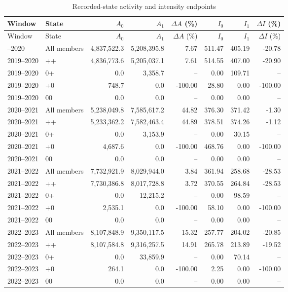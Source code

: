 \medskip\begin{longtable}{@{}llrrrrrr@{}}\caption{Recorded-state activity and intensity endpoints}\label{tab:record_state_activity_details}\\\toprule
Window & State & $A_0$ & $A_1$ & $\Delta A$ (\%) & $I_0$ & $I_1$ & $\Delta I$ (\%)\\
\midrule\endfirsthead\toprule
Window & State & $A_0$ & $A_1$ & $\Delta A$ (\%) & $I_0$ & $I_1$ & $\Delta I$ (\%)\\
\midrule\endhead\bottomrule\endfoot
2019--2020 & All members & 4,837,522.3 & 5,208,395.8 & 7.67 & 511.47 & 405.19 & -20.78\\
2019--2020 & ++ & 4,836,773.6 & 5,205,037.1 & 7.61 & 514.55 & 407.00 & -20.90\\
2019--2020 & 0+ & 0.0 & 3,358.7 & -- & 0.00 & 109.71 & --\\
2019--2020 & +0 & 748.7 & 0.0 & -100.00 & 28.80 & 0.00 & -100.00\\
2019--2020 & 00 & 0.0 & 0.0 & -- & 0.00 & 0.00 & --\\
2020--2021 & All members & 5,238,049.8 & 7,585,617.2 & 44.82 & 376.30 & 371.42 & -1.30\\
2020--2021 & ++ & 5,233,362.2 & 7,582,463.4 & 44.89 & 378.51 & 374.26 & -1.12\\
2020--2021 & 0+ & 0.0 & 3,153.9 & -- & 0.00 & 30.15 & --\\
2020--2021 & +0 & 4,687.6 & 0.0 & -100.00 & 468.76 & 0.00 & -100.00\\
2020--2021 & 00 & 0.0 & 0.0 & -- & 0.00 & 0.00 & --\\
2021--2022 & All members & 7,732,921.9 & 8,029,944.0 & 3.84 & 361.94 & 258.68 & -28.53\\
2021--2022 & ++ & 7,730,386.8 & 8,017,728.8 & 3.72 & 370.55 & 264.84 & -28.53\\
2021--2022 & 0+ & 0.0 & 12,215.2 & -- & 0.00 & 98.59 & --\\
2021--2022 & +0 & 2,535.1 & 0.0 & -100.00 & 58.10 & 0.00 & -100.00\\
2021--2022 & 00 & 0.0 & 0.0 & -- & 0.00 & 0.00 & --\\
2022--2023 & All members & 8,107,848.9 & 9,350,117.5 & 15.32 & 257.77 & 204.02 & -20.85\\
2022--2023 & ++ & 8,107,584.8 & 9,316,257.5 & 14.91 & 265.78 & 213.89 & -19.52\\
2022--2023 & 0+ & 0.0 & 33,859.9 & -- & 0.00 & 70.14 & --\\
2022--2023 & +0 & 264.1 & 0.0 & -100.00 & 2.25 & 0.00 & -100.00\\
2022--2023 & 00 & 0.0 & 0.0 & -- & 0.00 & 0.00 & --\\
\end{longtable}\endgroup
